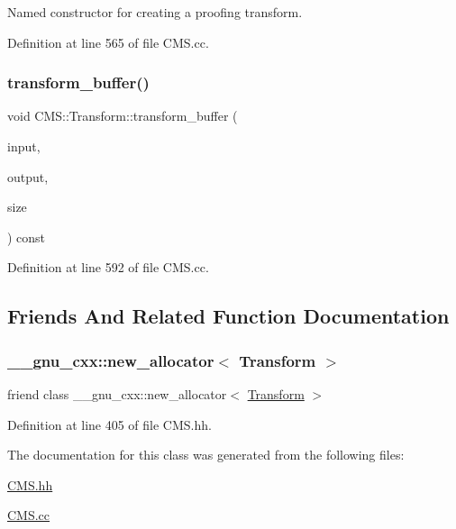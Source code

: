 Named constructor for creating a proofing transform. 



Definition at line 565 of file C\+M\+S.\+cc.

\mbox{\label{class_c_m_s_1_1_transform_a8e86a3c86ac37b272bac946667abeb8d}} 
\subsubsection{\texorpdfstring{transform\+\_\+buffer()}{transform\_buffer()}}
{\footnotesize\ttfamily void C\+M\+S\+::\+Transform\+::transform\+\_\+buffer (\begin{DoxyParamCaption}\item[{const unsigned char $\ast$}]{input,  }\item[{unsigned char $\ast$}]{output,  }\item[{cms\+U\+Int32\+Number}]{size }\end{DoxyParamCaption}) const}



Definition at line 592 of file C\+M\+S.\+cc.



\subsection{Friends And Related Function Documentation}
\mbox{\label{class_c_m_s_1_1_transform_aaeda30953f033efa311d71a812180996}} 
\subsubsection{\texorpdfstring{\+\_\+\+\_\+gnu\+\_\+cxx\+::new\+\_\+allocator$<$ Transform $>$}{\_\_gnu\_cxx::new\_allocator< Transform >}}
{\footnotesize\ttfamily friend class \+\_\+\+\_\+gnu\+\_\+cxx\+::new\+\_\+allocator$<$ \hyperlink{class_c_m_s_1_1_transform}{Transform} $>$\hspace{0.3cm}{\ttfamily [friend]}}



Definition at line 405 of file C\+M\+S.\+hh.



The documentation for this class was generated from the following files\+:\begin{DoxyCompactItemize}
\item 
\hyperlink{_c_m_s_8hh}{C\+M\+S.\+hh}\item 
\hyperlink{_c_m_s_8cc}{C\+M\+S.\+cc}\end{DoxyCompactItemize}
